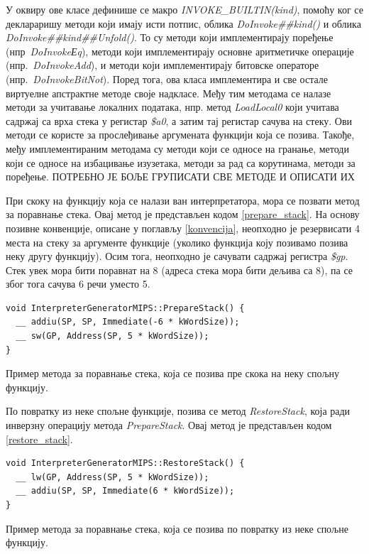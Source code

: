 \documentclass[12pt,oneside]{memoir}
\begin{document}
У оквиру ове класе дефинише се макро \textit{INVOKE\_BUILTIN(kind)}, помоћу ког се деклараришу методи који имају исти потпис, облика \textit{DoInvoke\#\#kind()} и облика \textit{DoInvoke\#\#kind\#\#Unfold()}. То су методи који имплементирају поређење (нпр~\textit{DoInvokeЕq}), методи који имплементирају основне аритметичке операције (нпр.~\textit{DoInvokeAdd}), и методи који имплементирају битовске операторе (нпр.~\textit{DoInvokeBitNot}). Поред тога, ова класа имплементира и све остале виртуелне апстрактне методе своје надкласе. Међу тим методама се налазе методи за учитавање локалних података, нпр. метод \textit{LoadLocal0} који учитава садржај са врха стека у регистар \textit{\$a0}, а затим тај регистар сачува на стеку. Ови методи се користе за прослеђивање аргумената функцији која се позива. Такође, међу имплементираним методама су методи који се односе на гранање, методи који се односе на избацивање изузетака, методи за рад са корутинама, методи за поређење. ПОТРЕБНО ЈЕ БОЉЕ ГРУПИСАТИ СВЕ МЕТОДЕ И ОПИСАТИ ИХ

При скоку на функцију која се налази ван интерпретатора, мора се позвати метод за поравнање стека. Овај метод је представљен кодом \ref{prepare_stack}. На основу позивне конвенције, описане у поглављу \ref{konvencija}, неопходно је резервисати 4 места на стеку за аргументе функције (уколико функција коју позивамо позива неку другу функцију). Осим тога, неопходно је сачувати садржај регистра \textit{\$gp}. Стек увек мора бити поравнат на 8 (адреса стека мора бити дељива са 8), па се због тога сачува 6 речи уместо 5.\\

\begin{listing}
\begin{verbatim}
void InterpreterGeneratorMIPS::PrepareStack() {
  __ addiu(SP, SP, Immediate(-6 * kWordSize));
  __ sw(GP, Address(SP, 5 * kWordSize));
}
\end{verbatim}
\caption{Пример метода за поравнање стека, која се позива пре скока на неку спољну функцију.}
\label{prepare_stack}
\end{listing}

По повратку из неке спољне функције, позива се метод \textit{RestoreStack}, која ради инверзну операцију метода \textit{PrepareStack}. Овај метод је представљен кодом \ref{restore_stack}.\\

\begin{listing}
\begin{verbatim}
void InterpreterGeneratorMIPS::RestoreStack() {
  __ lw(GP, Address(SP, 5 * kWordSize));
  __ addiu(SP, SP, Immediate(6 * kWordSize));
}
\end{verbatim}
\caption{Пример метода за поравнање стека, која се позива по повратку из неке спољне функцију.}
\label{restore_stack}
\end{listing}
\end{document}
